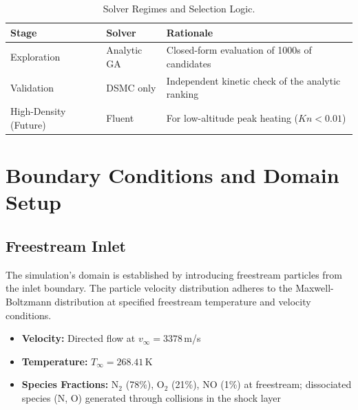 \begin{table}[H]
    \centering
    \caption{Solver Regimes and Selection Logic.}
    \label{tab:solver_regimes}
    \begin{tabularx}{\textwidth}{|l|>{\RaggedRight\arraybackslash}p{}|>{\RaggedRight\arraybackslash}X|}
        \hline
        \textbf{Stage} & \textbf{Solver} & \textbf{Rationale} \\ \hline
        Exploration & Analytic GA & Closed-form evaluation of 1000s of candidates \\ \hline
        Validation & DSMC only & Independent kinetic check of the analytic ranking \\ \hline
        High-Density (Future) & Fluent & For low-altitude peak heating ($Kn < 0.01$) \\ \hline
    \end{tabularx}
\end{table}

\section{Boundary Conditions and Domain Setup}

\subsection{Freestream Inlet}
The simulation's domain is established by introducing freestream particles from the inlet boundary. The particle velocity distribution adheres to the Maxwell-Boltzmann distribution at specified freestream temperature and velocity conditions.

\begin{itemize}
    \item \textbf{Velocity:} Directed flow at $v_{\infty} = 3378$\,m/s

    \item \textbf{Temperature:} $T_{\infty} = 268.41$\,K
    \item \textbf{Species Fractions:} N$_2$ (78\%), O$_2$ (21\%), NO (1\%) at freestream; dissociated species (N, O) generated through collisions in the shock layer
\end{itemize}

